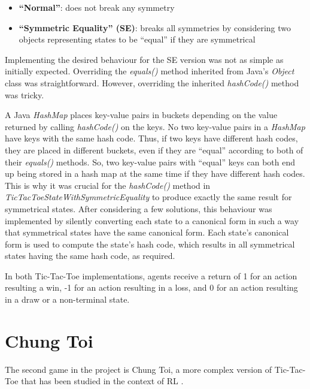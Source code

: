 \documentclass[11pt,a4paper,twoside,openright]{report}
\begin{document}
\begin{itemize}

	\item \textbf{``Normal''}:
does not break any symmetry

	\item \textbf{``Symmetric Equality'' (SE)}: 
breaks all symmetries by considering two objects representing states to be ``equal'' if they are symmetrical

\end{itemize}

Implementing the desired behaviour for the SE version was not as simple as initially expected. Overriding the \emph{equals()} method inherited from Java's \emph{Object} class was straightforward. However, overriding the inherited \emph{hashCode()} method was tricky.

A Java \emph{HashMap} places key-value pairs in buckets depending on the value returned by calling \emph{hashCode()} on the keys. No two key-value pairs in a \emph{HashMap} have keys with the same hash code. Thus, if two keys have different hash codes, they are placed in different buckets, even if they are ``equal'' according to both of their \emph{equals()} methods. So, two key-value pairs with ``equal'' keys can both end up being stored in a hash map at the same time if they have different hash codes. This is why it was crucial for the \emph{hashCode()} method in \emph{TicTacToeStateWithSymmetricEquality} to produce exactly the same result for symmetrical states. After considering a few solutions, this behaviour was implemented by silently converting each state to a canonical form in such a way that symmetrical states have the same canonical form. Each state's canonical form is used to compute the state's hash code, which results in all symmetrical states having the same hash code, as required.

In both Tic-Tac-Toe implementations, agents receive a return of 1 for an action resulting a win, -1 for an action resulting in a loss, and 0 for an action resulting in a draw or a non-terminal state.


\newpage

\section{Chung Toi}
\label{sec:ChungToi}

The second game in the project is Chung Toi, a more complex version of Tic-Tac-Toe that has been studied in the context of RL \cite{chung-toi-rl} \cite{chung-toi-params}.
\end{document}
